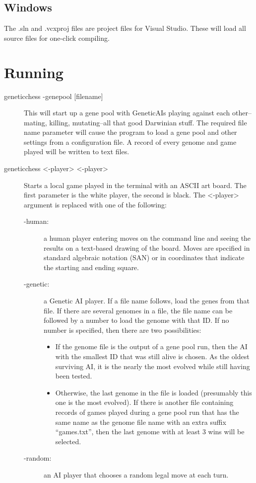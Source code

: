 \documentclass[letterpaper]{article}
\newcommand{\code}[1]{\textsf{#1}}
\renewcommand{\_}{\allowbreak\textunderscore\allowbreak}
\begin{document}
\subsection{Windows}
The \code{.sln} and \code{.vcxproj} files are project files for Visual Studio. These will load all source files for one-click compiling.


\section{Running}
\label{running}
\begin{description}
	\item[\code{genetic\_chess -genepool [file\_name]}]
This will start up a gene pool with Genetic\_AIs playing against each other--mating, killing, mutating--all that good Darwinian stuff. The required file name parameter will cause the program to load a gene pool and other settings from a configuration file. A record of every genome and game played will be written to text files.

	\item[\code{genetic\_chess <-player> <-player>}] Starts a local game played in the terminal with an ASCII art board. The first parameter is the white player, the second is black. The \code{<-player>} argument is replaced with one of the following:
	\begin{description}
		\item[\code{-human}:] a human player entering moves on the command line and seeing the results on a text-based drawing of the board. Moves are specified in standard algebraic notation (SAN) or in coordinates that indicate the starting and ending square. 
		\item[\code{-genetic}:] a Genetic AI player. If a file name follows, load the genes from that file. If there are several genomes in a file, the file name can be followed by a number to load the genome with that ID. If no number is specified, then there are two possibilities:
		\begin{itemize}
			\item If the genome file is the output of a gene pool run, then the AI with the smallest ID that was still alive is chosen. As the oldest surviving AI, it is the nearly the most evolved while still having been tested.
			\item Otherwise, the last genome in the file is loaded (presumably this one is the most evolved). If there is another file containing records of games played during a gene pool run that has the same name as the genome file name with an extra suffix ``\_games.txt'', then the last genome with at least 3 wins will be selected.
		\end{itemize}
		\item[\code{-random}:] an AI player that chooses a random legal move at each turn.
	\end{description}
\end{description}
\end{document}
